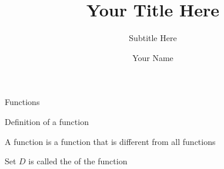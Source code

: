 \documentclass{beamer}
\title[- short title -]{Your Title Here}
\subtitle{Subtitle Here}
\author{Your Name}
\institute{Institute Name}
\date{}    %
\begin{document}

\begin{frame} %

\titlepage

\end{frame}

\begin{frame}[t]{Functions} \vspace{4pt}

\begin{block}{Definition of a function}

\vspace{4pt}

A function is a function that is different from all functions

\vspace{4pt}

\end{block}


\end{frame}

\begin{frame}



Set $D$ is called the
of the function

\end{frame}
\end{document}
